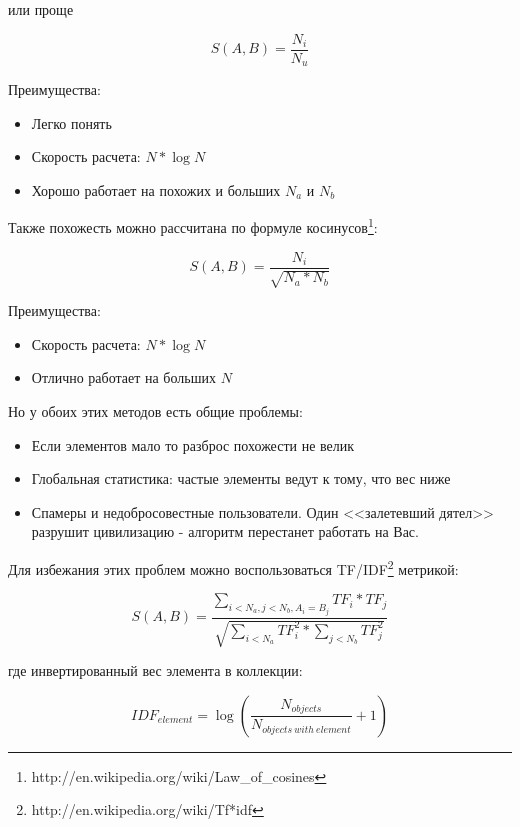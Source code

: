 или проще

\begin{equation}
 \label{eq:smlar2}
 S(A,B) = \frac{N_{i}}{N_{u}}
\end{equation}

Преимущества:

\begin{itemize}
\item Легко понять
\item Скорость расчета: $N * \log{N}$
\item Хорошо работает на похожих и больших $N_a$ и $N_b$
\end{itemize}

Также похожесть можно рассчитана по формуле косинусов\footnote{http://en.wikipedia.org/wiki/Law\_of\_cosines}:

\begin{equation}
 \label{eq:smlar3}
 S(A,B) = \frac{N_{i}}{\sqrt{N_{a}*N_{b}}}
\end{equation}

Преимущества:

\begin{itemize}
\item Скорость расчета: $N * \log{N}$
\item Отлично работает на больших $N$
\end{itemize}

Но у обоих этих методов есть общие проблемы:

\begin{itemize}
\item Если элементов мало то разброс похожести не велик
\item Глобальная статистика: частые элементы ведут к тому, что вес ниже
\item Спамеры и недобросовестные пользователи. Один <<залетевший дятел>> разрушит цивилизацию - алгоритм перестанет работать на Вас.
\end{itemize}

Для избежания этих проблем можно воспользоваться TF/IDF\footnote{http://en.wikipedia.org/wiki/Tf*idf} метрикой:

\begin{equation}
 \label{eq:smlar4}
 S(A,B) = \frac{\sum_{i < N_{a}, j < N_{b}, A_{i} = B_{j}}TF_{i} * TF_{j}}{\sqrt{\sum_{i < N_{a}}TF_{i}^{2} * \sum_{j < N_{b}}TF_{j}^{2}}}
\end{equation}

где инвертированный вес элемента в коллекции:

\begin{equation}
 \label{eq:smlar5}
 IDF_{element} = \log{(\frac{N_{objects}}{N_{objects\ with\ element}} + 1)}
\end{equation}

